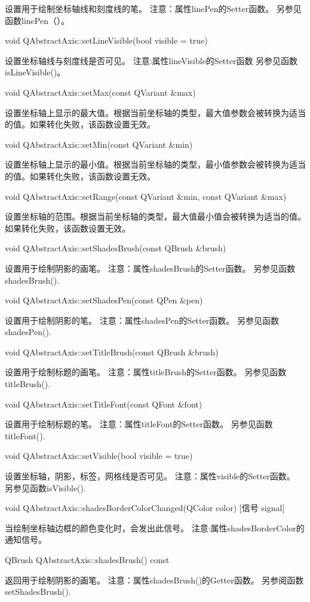 设置用于绘制坐标轴线和刻度线的笔。 注意：属性linePen的Setter函数。 另参见函数linePen（）。

void QAbstractAxis::setLineVisible(bool visible = true) 

设置坐标轴线与刻度线是否可见。 注意:属性lineVisible的Setter函数 另参见函数isLineVisible()。

void QAbstractAxis::setMax(const QVariant \&max) 

设置坐标轴上显示的最大值。根据当前坐标轴的类型，最大值参数会被转换为适当的值。如果转化失败，该函数设置无效。

void QAbstractAxis::setMin(const QVariant \&min) 

设置坐标轴上显示的最小值。根据当前坐标轴的类型，最小值参数会被转换为适当的值。如果转化失败，该函数设置无效。

void QAbstractAxis::setRange(const QVariant \&min, const QVariant
\&max) 

设置坐标轴的范围。根据当前坐标轴的类型，最大值最小值会被转换为适当的值。如果转化失败，该函数设置无效。

void QAbstractAxis::setShadesBrush(const QBrush \&brush)

 设置用于绘制阴影的画笔。 注意：属性shadesBrush的Setter函数。 另参见函数shadesBrush().

void QAbstractAxis::setShadesPen(const QPen \&pen)

 设置用于绘制阴影的笔。 注意：属性shadesPen的Setter函数。 另参见函数shadesPen().

void QAbstractAxis::setTitleBrush(const QBrush \&brush) 

设置用于绘制标题的画笔。 注意：属性titleBrush的Setter函数。 另参见函数titleBrush().

void QAbstractAxis::setTitleFont(const QFont \&font) 

设置用于绘制标题的笔。 注意：属性titleFont的Setter函数。 另参见函数titleFont().

void QAbstractAxis::setVisible(bool visible = true) 

设置坐标轴，阴影，标签，网格线是否可见。 注意：属性visible的Setter函数。 另参见函数isVisible().

void QAbstractAxis::shadesBorderColorChanged(QColor color) [信号
signal] 

当绘制坐标轴边框的颜色变化时，会发出此信号。 注意:属性shadesBorderColor的通知信号。

QBrush QAbstractAxis::shadesBrush() const 

返回用于绘制阴影的画笔。 注意：属性shadesBrush()的Getter函数。 另参阅函数setShadesBrush().

